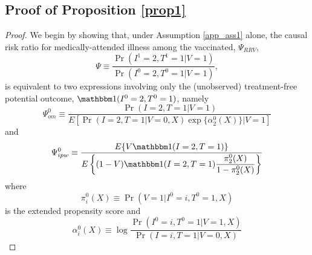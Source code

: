 \begin{appendix}
    
    \newpage
    \subsection{Proof of Proposition \ref{prop1}} \label{sec:proof1}
    
    \begin{proof}
    We begin by showing that, under Assumption \ref{app_ass1} alone, the causal risk ratio for medically-attended illness among the vaccinated, $\Psi_{RRV}$, 
    \begin{equation*}
        \Psi \equiv \dfrac{\Pr(I^1=2, T^1=1|V=1)}{\Pr(I^0=2, T^0=1|V=1)},
    \end{equation*}
    is equivalent to two expressions involving only the (unobserved) treatment-free potential outcome, $\mathbbm 1(I^0 = 2, T^0=1)$, namely 
    \begin{equation}
        \Psi^0_{om} \equiv \dfrac{\Pr(I = 2, T = 1 | V = 1)}{E\left[\Pr(I = 2, T = 1 | V = 0, X) \exp\{\alpha^0_2(X)\}\Big| V = 1 \right]}
    \end{equation}
    and 
    \begin{equation}
        \Psi^0_{ipw} \equiv \dfrac{E\{V \mathbbm 1(I = 2, T = 1)\}}{E\left\{ (1 - V) \mathbbm 1(I = 2, T = 1) \dfrac{\pi^0_2(X)}{1 - \pi^0_2(X)}\right\}}
    \end{equation}
    where 
    \begin{equation*}
        \pi^0_i(X) \equiv \Pr(V = 1 | I^0 = i, T^0 = 1,  X)
    \end{equation*}
    is the extended propensity score and 
     \begin{equation*}
        \alpha^0_i(X) \equiv \log \dfrac{\Pr(I^0 = i, T^0 = 1 | V = 1, X)}{\Pr(I = i, T=1 | V = 0, X)}
    \end{equation*}
    

\end{proof}
\end{appendix}
